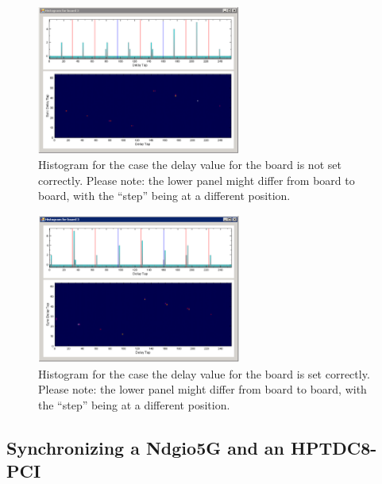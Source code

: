         \begin{figure}[ht]
            \begin{center}
                \includegraphics[width=0.6\textwidth]{figures/HistoUncalib.pdf}
                \caption{Histogram for the case the delay value for the board is not set correctly. Please note: the lower panel might differ from board to board, with the ``step'' being at a different position.\label{fig:HistoUncalib}}
            \end{center}
        \end{figure}

        \begin{figure}[hb]
            \begin{center}
                \includegraphics[width=0.6\textwidth]{figures/HistoCalib.pdf}
                \caption{Histogram for the case the delay value for the board is set correctly. Please note: the lower panel might differ from board to board, with the ``step'' being at a different position.\label{fig:HistoCalib}}
            \end{center}
        \end{figure}

    \subsection{Synchronizing a Ndgio5G and an HPTDC8-PCI}


